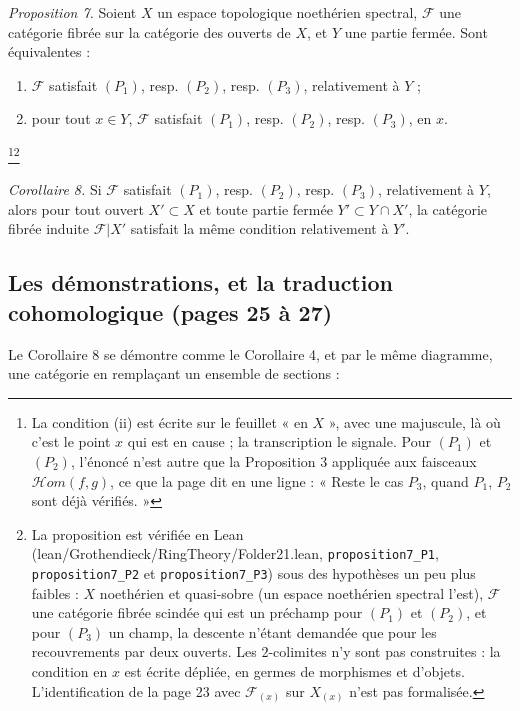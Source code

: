 \documentclass[11pt,a4paper]{article}
\begin{document}
\emph{Proposition 7.} Soient $X$ un espace topologique noethérien spectral,
$\mathcal{F}$ une catégorie fibrée sur la catégorie des ouverts de $X$, et $Y$
une partie fermée. Sont équivalentes :
\begin{enumerate}
  \item[(i)] $\mathcal{F}$ satisfait $(P_{1})$, resp. $(P_{2})$, resp.
  $(P_{3})$, relativement à $Y$ ;
  \item[(ii)] pour tout $x \in Y$, $\mathcal{F}$ satisfait $(P_{1})$, resp.
  $(P_{2})$, resp. $(P_{3})$, en $x$.
\end{enumerate}

\footnote{La condition (ii) est écrite sur le feuillet « en $X$ », avec une
majuscule, là où c'est le point $x$ qui est en cause ; la transcription le
signale. Pour $(P_{1})$ et $(P_{2})$, l'énoncé n'est autre que la Proposition 3
appliquée aux faisceaux $\mathcal{H}om(f,g)$, ce que la page dit en une ligne :
« Reste le cas $P_{3}$, quand $P_{1}$, $P_{2}$ sont déjà vérifiés. »}\footnote{La
proposition est vérifiée en Lean (lean/Grothendieck/RingTheory/Folder21.lean,
\texttt{proposition7\_P1}, \texttt{proposition7\_P2} et
\texttt{proposition7\_P3}) sous des hypothèses un peu plus faibles : $X$
noethérien et quasi-sobre (un espace noethérien spectral l'est), $\mathcal{F}$
une catégorie fibrée scindée qui est un préchamp pour $(P_1)$ et $(P_2)$, et pour
$(P_3)$ un champ, la descente n'étant demandée que pour les recouvrements par
deux ouverts. Les $2$-colimites n'y sont pas construites : la condition en $x$
est écrite dépliée, en germes de morphismes et d'objets. L'identification de la
page 23 avec $\mathcal{F}_{(x)}$ sur $X_{(x)}$ n'est pas formalisée.}

\emph{Corollaire 8.} Si $\mathcal{F}$ satisfait $(P_{1})$, resp. $(P_{2})$,
resp. $(P_{3})$, relativement à $Y$, alors pour tout ouvert $X' \subset X$ et
toute partie fermée $Y' \subset Y \cap X'$, la catégorie fibrée induite
$\mathcal{F}|X'$ satisfait la même condition relativement à $Y'$.

\subsection*{Les démonstrations, et la traduction cohomologique (pages 25 à 27)}

Le Corollaire 8 se démontre comme le Corollaire 4, et par le même diagramme, une
catégorie en remplaçant un ensemble de sections :

\end{document}
